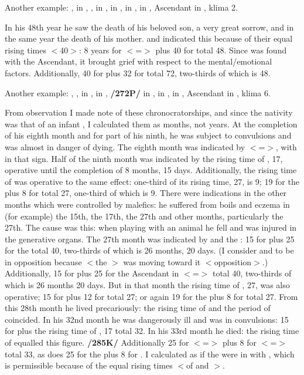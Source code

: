 Another example: \Sun, \Mercury\xspace in \Capricorn, \Moon, \Saturn\xspace in \Sagittarius, \Jupiter\xspace in \Cancer, \Mars\xspace in \Virgo, \Venus\xspace in \Aquarius, Ascendant in \Libra, klima 2. 

In his 48th year he saw the death of his beloved son, a very great sorrow, and in the same year the death of his mother. \Virgo\xspace and \Libra\xspace indicated this because of their equal rising times $<$40$>$: 8 years for \Libra\xspace $<$=\Venus$>$ plus 40 for \Virgo\xspace total 48. Since \Mars\xspace was found with the Ascendant, it brought grief with respect to the mental/emotional factors. Additionally, 40 for \Virgo\xspace plus 32 for \Sagittarius\xspace total 72, two-thirds of which is 48.

Another example: \Sun, \Mercury, \Venus\xspace in \Leo, \Moon\xspace in \Virgo, \Saturn\xspace \textbf{/272P/} in \Libra, \Jupiter\xspace in \Capricorn, \Mars\xspace in \Aries, Ascendant in \Cancer, klima 6. 

From observation I made note of these chronocratorships, and since the nativity was that of an infant \mndl, I calculated them as months, not years. At the completion of his eighth month and for part of his ninth, he was subject to convulsions and was almost in danger of dying. The eighth month was indicated by \Libra\xspace $<$=\Venus$>$, with \Saturn\xspace in that sign. Half of the ninth month was indicated by the rising time of \Aries, 17, operative until the completion of 8 months, 15 days. Additionally, the rising time of \Capricorn\xspace was operative to the same effect: one-third of its rising time, 27, is 9; 19 for the \Sun\xspace plus 8 for \Venus\xspace total 27, one-third of which is 9. There were indications in the other months which were controlled by malefics: he suffered from boils and eczema in (for example) the 15th, the 17th, the 27th and other months, particularly the 27th. The cause was this: when playing with
an animal he fell and was injured in the generative organs. The 27th month was indicated by \Mars\xspace and the \Moon: 15 for \Mars\xspace plus 25 for the \Moon\xspace total 40, two-thirds of which is 26 months, 20 days. (I consider \Aries\xspace and \Virgo\xspace to be in opposition because $<$the \Moon$>$ was moving toward it $<$opposition$>$.) Additionally, 15 for \Mars\xspace plus 25 for the Ascendant in \Cancer\xspace $<$=\Moon$>$ total 40, two-thirds of which is 26 months 20 days. But in that month the rising time of \Capricorn, 27, was also operative; 15 for \Mars\xspace plus 12 for \Jupiter\xspace total 27; or again 19 for the \Sun\xspace plus 8 for \Venus\xspace total 27. From this 28th month he lived precariously: the rising time of \Libra\xspace and the period of \Saturn\xspace coincided. In his 32nd month he was dangerously ill and was in convulsions: 15 for \Mars\xspace plus the rising time of \Aries, 17 total 32. In his 33rd month he died: the rising time of \Cancer\xspace equalled this figure. \textbf{/285K/} Additionally 25 for \Cancer\xspace $<$=\Moon$>$ plus 8 for \Libra\xspace $<$=\Venus$>$ total 33, as does 25 for the \Moon\xspace plus 8 for \Libra. I calculated as if the \Moon\xspace were in \Libra\xspace with \Saturn, which is permissible because of the equal rising times $<$of \Virgo\xspace and \Libra$>$.

